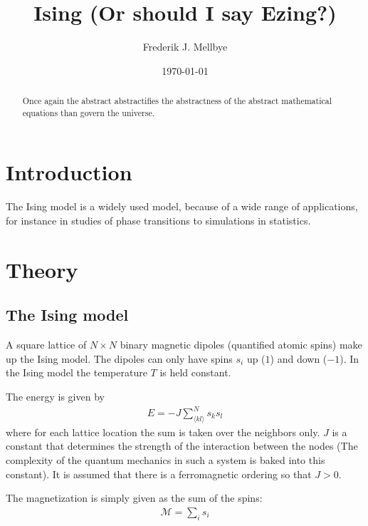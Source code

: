 \documentclass[aps,reprint]{revtex4-1}
\begin{document}
\title{Ising (Or should I say Ezing?)}
\author{Frederik J. Mellbye}
\date{\today}

\begin{abstract}
Once again the abstract abstractifies the abstractness of the abstract mathematical
equations than govern the universe.
\end{abstract}
\maketitle
\tableofcontents
\makeatletter
\let\toc@pre\relax
\let\toc@post\relax
\makeatother

\newpage

\section{Introduction}
\label{sec:introduction}
The Ising model is a widely used model, because of a wide range of applications,
for instance in studies of phase transitions to simulations in statistics.
\section{Theory}
\label{sec:theory}
\subsection{The Ising model}
A square lattice of $N \times N$ binary magnetic dipoles (quantified atomic spins)
make up the Ising model. The dipoles can only have spins $s_i$ up ($1$) and down ($-1$).
In the Ising model the temperature $T$ is held constant.

The energy is given by
\begin{align}
  E = -J \sum_{\langle kl \rangle}^{N} s_k s_l
\end{align}
where for each lattice location the sum is taken over the neighbors only. $J$ is
a constant that determines the strength of the interaction between the nodes
(The complexity of the quantum mechanics in such a system is baked into
this constant). It is assumed that there is a ferromagnetic ordering so that $J > 0$.

The magnetization is simply given as the sum of the spins:
\begin{align}
  \mathcal{M} = \sum_i s_i
\end{align}
\end{document}

